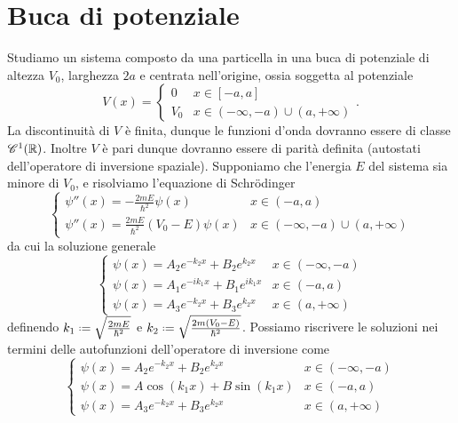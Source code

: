 \section{Buca di potenziale}
Studiamo un sistema composto da una particella in una buca di potenziale di altezza $V_0$, larghezza $2a$ e centrata nell'origine, ossia soggetta al potenziale
\begin{equation}
	V(x)=
	\begin{cases}
		0	&x\in[-a,a]\\
		V_0	&x\in(-\infty,-a)\cup(a,+\infty)
	\end{cases}.
	\label{eq:buca-potenziale-finita}
\end{equation}
La discontinuità di $V$ è finita, dunque le funzioni d'onda dovranno essere di classe $\mathscr{C}^{{1}}(\mathbb{R})$.
Inoltre $V$ è pari dunque dovranno essere di parità definita (autostati dell'operatore di inversione spaziale).
Supponiamo che l'energia $E$ del sistema sia minore di $V_0$, e risolviamo l'equazione di Schr\"odinger
\begin{equation}
	\begin{cases}
		\psi''(x)=-\frac{2mE}{\hbar^2}\psi(x)		&x\in(-a,a)\\
		\psi''(x)=\frac{2mE}{\hbar^2}(V_0-E)\psi(x)	&x\in(-\infty,-a)\cup(a,+\infty)
	\end{cases}
	\label{eq:schrodinger-buca-finita}
\end{equation}
da cui la soluzione generale
\begin{equation}
	\begin{cases}
		\psi(x)=A_2e^{-k_2x}+B_2e^{k_2x}	&x\in(-\infty,-a)\\
		\psi(x)=A_1e^{-ik_1x}+B_1e^{ik_1x}	&x\in(-a,a)\\
		\psi(x)=A_3e^{-k_2x}+B_3e^{k_2x}	&x\in(a,+\infty)
	\end{cases}
	\label{eq:soluzione-generale-schrodinger-buca-finita}
\end{equation}
definendo $k_1\defeq\sqrt{\frac{2mE}{\hbar^2}}$ e $k_2\defeq\sqrt{\frac{2m(V_0-E)}{\hbar^2}}$.
Possiamo riscrivere le soluzioni nei termini delle autofunzioni dell'operatore di inversione come
\begin{equation}
	\begin{cases}
		\psi(x)=A_2e^{-k_2x}+B_2e^{k_2x}	&x\in(-\infty,-a)\\
		\psi(x)=A\cos(k_1x)+B\sin(k_1x)		&x\in(-a,a)\\
		\psi(x)=A_3e^{-k_2x}+B_3e^{k_2x}	&x\in(a,+\infty)
	\end{cases}
	\label{eq:schrodinger-buca-potenziale-finita-autofunzioni-inversione}
\end{equation}

